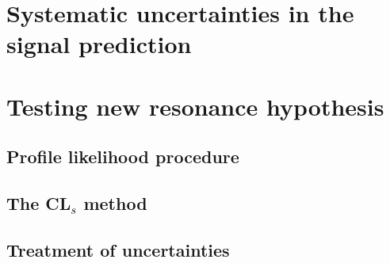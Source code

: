 \section{Systematic uncertainties in the signal prediction}

\section{Testing new resonance hypothesis}
\subsection{Profile likelihood procedure}
\subsection{The CL$_{s}$ method}
\subsection{Treatment of uncertainties}

